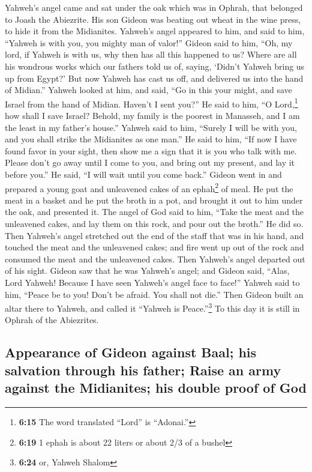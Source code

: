  Yahweh's angel came and sat under the oak which was in
Ophrah, that belonged to Joash the Abiezrite. His son Gideon was beating
out wheat in the wine press, to hide it from the Midianites.
 Yahweh's angel appeared to him, and said to him,
``Yahweh is with you, you mighty man of valor!''  Gideon
said to him, ``Oh, my lord, if Yahweh is with us, why then has all this
happened to us? Where are all his wondrous works which our fathers told
us of, saying, `Didn't Yahweh bring us up from Egypt?' But now Yahweh
has cast us off, and delivered us into the hand of Midian.''
 Yahweh looked at him, and said, ``Go in this your might,
and save Israel from the hand of Midian. Haven't I sent you?''
 He said to him, ``O Lord,\footnote{\textbf{6:15} The
  word translated ``Lord'' is ``Adonai.''} how shall I save Israel?
Behold, my family is the poorest in Manasseh, and I am the least in my
father's house.''  Yahweh said to him, ``Surely I will be
with you, and you shall strike the Midianites as one man.''
 He said to him, ``If now I have found favor in your
sight, then show me a sign that it is you who talk with me.
 Please don't go away until I come to you, and bring out
my present, and lay it before you.'' He said, ``I will wait until you
come back.''  Gideon went in and prepared a young goat
and unleavened cakes of an ephah\footnote{\textbf{6:19} 1 ephah is about
  22 liters or about 2/3 of a bushel} of meal. He put the meat in a
basket and he put the broth in a pot, and brought it out to him under
the oak, and presented it.  The angel of God said to him,
``Take the meat and the unleavened cakes, and lay them on this rock, and
pour out the broth.'' He did so.  Then Yahweh's angel
stretched out the end of the staff that was in his hand, and touched the
meat and the unleavened cakes; and fire went up out of the rock and
consumed the meat and the unleavened cakes. Then Yahweh's angel departed
out of his sight.  Gideon saw that he was Yahweh's angel;
and Gideon said, ``Alas, Lord Yahweh! Because I have seen Yahweh's angel
face to face!''  Yahweh said to him, ``Peace be to you!
Don't be afraid. You shall not die.''  Then Gideon built
an altar there to Yahweh, and called it ``Yahweh is Peace.''\footnote{\textbf{6:24}
  or, Yahweh Shalom} To this day it is still in Ophrah of the
Abiezrites.

\hypertarget{appearance-of-gideon-against-baal-his-salvation-through-his-father-raise-an-army-against-the-midianites-his-double-proof-of-god}{%
\subsection{Appearance of Gideon against Baal; his salvation through his
father; Raise an army against the Midianites; his double proof of
God}\label{appearance-of-gideon-against-baal-his-salvation-through-his-father-raise-an-army-against-the-midianites-his-double-proof-of-god}}

